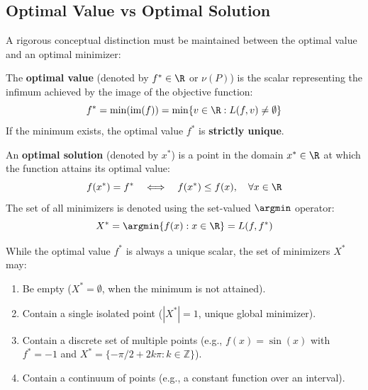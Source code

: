 \subsection{Optimal Value vs Optimal Solution}
A rigorous conceptual distinction must be maintained between the optimal value and an optimal minimizer:

\begin{definition}
The \textbf{optimal value} (denoted by $f^* \in \R$ or $\nu(P)$) is the scalar representing the infimum achieved by the image of the objective function:
\begin{equation}
f^* = \min(\operatorname{im}(f)) = \min \{ v \in \R : L(f, v) \neq \emptyset \}
\end{equation}
If the minimum exists, the optimal value $f^*$ is \textbf{strictly unique}.
\end{definition}

\begin{definition}
An \textbf{optimal solution} (denoted by $x^*$) is a point in the domain $x^* \in \R$ at which the function attains its optimal value:
\begin{equation}
f(x^*) = f^* \quad \Longleftrightarrow \quad f(x^*) \le f(x), \quad \forall x \in \R
\end{equation}
The set of all minimizers is denoted using the set-valued $\argmin$ operator:
\begin{equation}
X^* = \argmin \{ f(x) : x \in \R \} = L(f, f^*)
\end{equation}
\end{definition}

\begin{property}
While the optimal value $f^*$ is always a unique scalar, the set of minimizers $X^*$ may:
\begin{enumerate}
    \item Be empty ($X^* = \emptyset$, when the minimum is not attained).
    \item Contain a single isolated point ($|X^*| = 1$, unique global minimizer).
    \item Contain a discrete set of multiple points (e.g., $f(x) = \sin(x)$ with $f^* = -1$ and $X^* = \{ -\pi/2 + 2k\pi : k \in \mathbb{Z} \}$).
    \item Contain a continuum of points (e.g., a constant function over an interval).
\end{enumerate}
\end{property}

